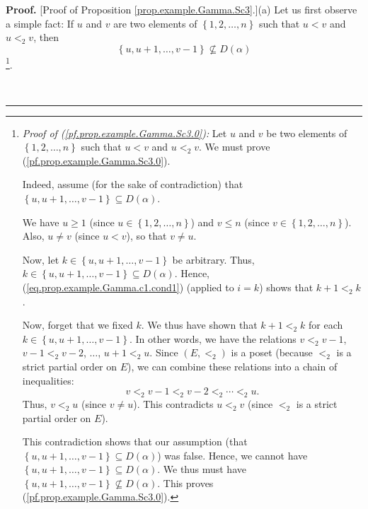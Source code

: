 \documentclass[numbers=enddot,12pt,final,onecolumn,notitlepage,abstracton]{scrartcl}
\theoremstyle{definition}
\newenvironment{proof}[1][Proof]{\noindent\textbf{#1.} }{\ \rule{0.5em}{0.5em}}
\newenvironment{verlong}{}{}
\begin{document}
\begin{verlong}
\begin{footnotesize}
\begin{proof}
[Proof of Proposition \ref{prop.example.Gamma.Sc3}.](a) Let us first observe a
simple fact: If $u$ and $v$ are two elements of $\left\{  1,2,\ldots
,n\right\}  $ such that $u<v$ and $u<_{2}v$, then
\begin{equation}
\left\{  u,u+1,\ldots,v-1\right\}  \not \subseteq D\left(  \alpha\right)
\label{pf.prop.example.Gamma.Sc3.0}%
\end{equation}
\footnote{\textit{Proof of (\ref{pf.prop.example.Gamma.Sc3.0}):} Let $u$ and
$v$ be two elements of $\left\{  1,2,\ldots,n\right\}  $ such that $u<v$ and
$u<_{2}v$. We must prove (\ref{pf.prop.example.Gamma.Sc3.0}).
\par
Indeed, assume (for the sake of contradiction) that $\left\{  u,u+1,\ldots
,v-1\right\}  \subseteq D\left(  \alpha\right)  $.
\par
We have $u\geq1$ (since $u\in\left\{  1,2,\ldots,n\right\}  $) and $v\leq n$
(since $v\in\left\{  1,2,\ldots,n\right\}  $). Also, $u\neq v$ (since $u<v$),
so that $v\neq u$.
\par
Now, let $k\in\left\{  u,u+1,\ldots,v-1\right\}  $ be arbitrary. Thus,
$k\in\left\{  u,u+1,\ldots,v-1\right\}  \subseteq D\left(  \alpha\right)  $.
Hence, (\ref{eq.prop.example.Gamma.c1.cond1}) (applied to $i=k$) shows that
$k+1<_{2}k$.
\par
Now, forget that we fixed $k$. We thus have shown that $k+1<_{2}k$ for each
$k\in\left\{  u,u+1,\ldots,v-1\right\}  $. In other words, we have the
relations $v<_{2}v-1$, $v-1<_{2}v-2$, $\ldots$, $u+1<_{2}u$. Since $\left(
E,<_{2}\right)  $ is a poset (because $<_{2}$ is a strict partial order on
$E$), we can combine these relations into a chain of inequalities:%
\[
v<_{2}v-1<_{2}v-2<_{2}\cdots<_{2}u.
\]
Thus, $v<_{2}u$ (since $v\neq u$). This contradicts $u<_{2}v$ (since $<_{2}$
is a strict partial order on $E$).
\par
This contradiction shows that our assumption (that $\left\{  u,u+1,\ldots
,v-1\right\}  \subseteq D\left(  \alpha\right)  $) was false. Hence, we cannot
have $\left\{  u,u+1,\ldots,v-1\right\}  \subseteq D\left(  \alpha\right)  $.
We thus must have $\left\{  u,u+1,\ldots,v-1\right\}  \not \subseteq D\left(
\alpha\right)  $. This proves (\ref{pf.prop.example.Gamma.Sc3.0}).}.


\end{proof}
\end{footnotesize}
\end{verlong}
\end{document}
